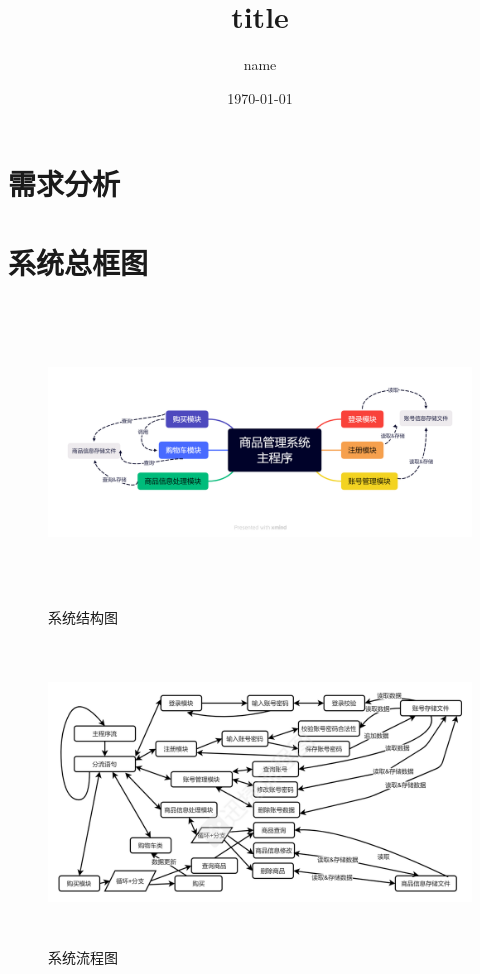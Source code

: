 \documentclass[a4paper]{article}
\title{title}
\author{name}
\date{\today}
\begin{document}
\maketitle
\begin{spacing}{1.2}%
    \tableofcontents
\end{spacing}
\thispagestyle{main}

\clearpage

\setcounter{page}{1}
\renewcommand{\thepage}{\arabic{page}}
\section{需求分析}\seccontent

\sectionbreak
\section{系统总框图}

\begin{figure}[htbp]
    \centering
    \includegraphics[width=\textwidth,height=8cm]{fig/struct.png}
    \caption{系统结构图}
\end{figure}

\begin{figure}[htbp]
    \centering
    \includegraphics[width=\textwidth,height=8cm]{fig/StructPic.png}
    \caption{系统流程图}
\end{figure}
\end{document}
